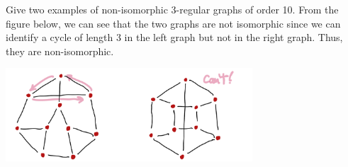 \begin{hwproblem}{3}{
    Give two examples of non-isomorphic 3-regular graphs of order 10.
  }
  From the figure below, we can see that the two graphs are not isomorphic 
  since we can identify a cycle of length 3 in the left graph but not in the 
  right graph. Thus, they are non-isomorphic.
  \begin{center}
    \includegraphics[width=0.69\textwidth]{figures/p3}
  \end{center}
\end{hwproblem}

